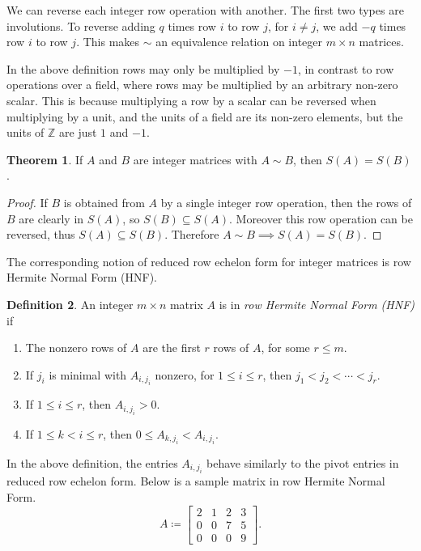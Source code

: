 \documentclass[12pt,a4paper]{article}
\newcommand{\Z}{\mathbb{Z}}
\theoremstyle{definition}
\newtheorem{theorem}{Theorem}[section]
\newtheorem{definition}[theorem]{Definition}
\begin{document}
We can reverse each integer row operation with another. The first two types are involutions. To reverse adding $q$ times row $i$ to row $j$, for $i\neq j$, we add $-q$ times row $i$ to row $j$. This makes $\sim$ an equivalence relation on integer $m\times n$ matrices.

In the above definition rows may only be multiplied by $-1$, in contrast to row operations over a field, where rows may be multiplied by an arbitrary non-zero scalar. This is because multiplying a row by a scalar can be reversed when multiplying by a unit, and the units of a field are its non-zero elements, but the units of $\Z$ are just $1$ and $-1$.

\begin{theorem}
  If $A$ and $B$ are integer matrices with $A\sim B$, then $S(A)=S(B)$.
\end{theorem}

\begin{proof}
  If $B$ is obtained from $A$ by a single integer row operation, then the rows of $B$ are clearly in $S(A)$, so $S(B)\subseteq S(A)$. Moreover this row operation can be reversed, thus $S(A)\subseteq S(B)$. Therefore $A\sim B\implies S(A)=S(B)$.
\end{proof}

The corresponding notion of reduced row echelon form for integer matrices is row Hermite Normal Form (HNF).

\begin{definition}
  An integer $m\times n$ matrix $A$ is in \emph{row Hermite Normal Form (HNF)} if
  \begin{enumerate}
  \item The nonzero rows of $A$ are the first $r$ rows of $A$, for some $r\leq m$.
  \item If $j_i$ is minimal with $A_{i,j_i}$ nonzero, for $1\leq i\leq r$, then $j_1<j_2<\cdots<j_r$.
  \item If $1\leq i\leq r$, then $A_{i,j_i}>0$.
  \item If $1\leq k<i\leq r$, then $0\leq A_{k,j_i}<A_{i,j_i}$.
  \end{enumerate}
\end{definition}

In the above definition, the entries $A_{i,j_i}$ behave similarly to the pivot entries in reduced row echelon form. Below is a sample matrix in row Hermite Normal Form.
\[ A \coloneqq
  \begin{bmatrix}
    2 & 1 & 2 & 3 \\
    0 & 0 & 7 & 5 \\
    0 & 0 & 0 & 9
  \end{bmatrix}.
\]
\end{document}
